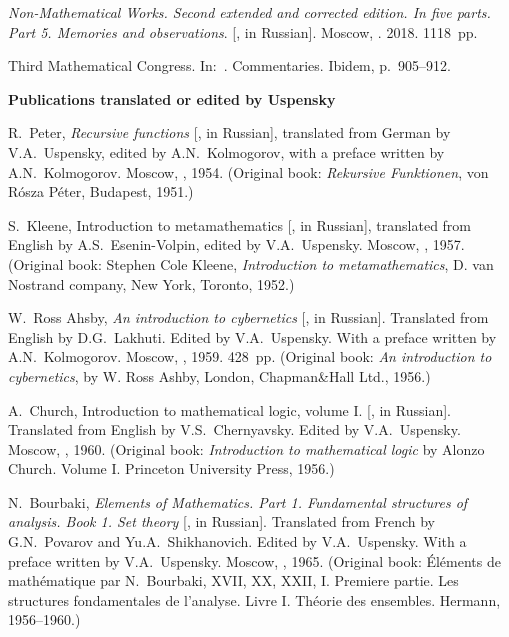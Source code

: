 \documentclass[12pt]{article}
\theoremstyle{remark}
\begin{document}
\begin{thebibliography}{99}
\emph{Non-Mathematical Works. Second extended and corrected edition. In five parts. Part 5. Memories and observations}. [\emph{}, in Russian]. Moscow, . 2018. 1118~pp. 

 Third Mathematical Congress. In:~\cite[p.~897--905]{2018a}. Commentaries. Ibidem, p.~905--912.

\item[]\hspace{-\labelwidth}\hspace{-\labelsep}\textbf{Publications translated or edited by Uspensky}

R.~Peter, \emph{Recursive functions} [, in Russian], translated from German by V.A.~Uspensky, edited by A.N.~Kolmogorov, with a preface written by A.N.~Kolmogorov. Moscow,  , 1954. (Original book: \emph{Rekursive Funktionen}, von R\'osza P\'eter, Budapest, 1951.)

S.~Kleene, Introduction to metamathematics [, in Russian], translated from English by A.S.~Esenin-Volpin, edited by V.A.~Uspensky. Moscow,  , 1957. (Original book: Stephen Cole Kleene, \emph{Introduction to metamathematics}, D. van Nostrand company, New York, Toronto, 1952.)

W.~Ross Ahsby, \emph{An introduction to cybernetics} [, in Russian]. Translated from English by D.G.~Lakhuti. Edited by V.A.~Uspensky. With a preface written by A.N.~Kolmogorov. Moscow, , 1959. 428~pp. (Original book: \emph{An introduction to cybernetics}, by W. Ross Ashby, London, Chapman\&Hall Ltd., 1956.)

A.~Church, Introduction to mathematical logic, volume I. [, in Russian]. Translated from English by V.S.~Chernyavsky. Edited by V.A.~Uspensky. Moscow, , 1960. (Original book: \emph{Introduction to mathematical logic} by Alonzo Church. Volume I. Princeton University Press, 1956.)

N.~Bourbaki, \emph{Elements of Mathematics. Part 1. Fundamental structures of analysis. Book 1. Set theory} [, in Russian]. Translated from French by G.N.~Povarov and Yu.A.~Shikhanovich. Edited by V.A.~Uspensky. With a preface written by V.A.~Uspensky. Moscow, , 1965. (Original book: \'El\'ements de math\'ematique par N.~Bourbaki, XVII, XX, XXII, I. Premiere partie. Les structures fondamentales de l'analyse. Livre I. Th\'eorie des ensembles. Hermann, 1956--1960.)


\end{thebibliography}
\end{document}
